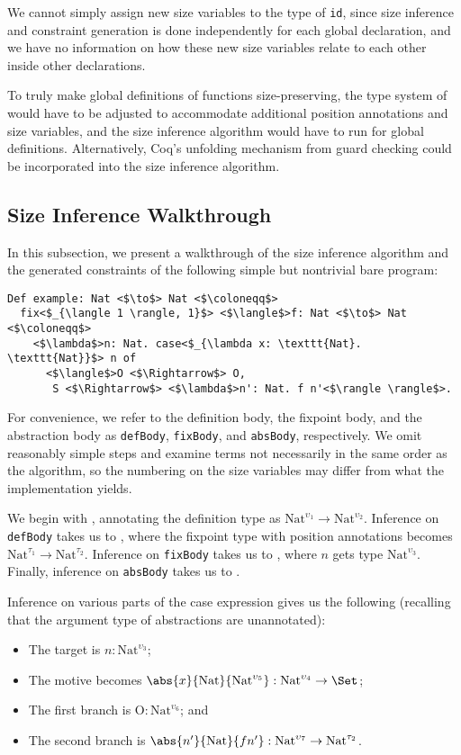 We cannot simply assign new size variables to the type of \texttt{id}, since size inference and constraint generation is done independently for each global declaration, and we have no information on how these new size variables relate to each other inside other declarations.

To truly make global definitions of functions size-preserving, the type system of \lang would have to be adjusted to accommodate additional position annotations and size variables, and the size inference algorithm would have to run \RecCheck for global definitions.
Alternatively, Coq's unfolding mechanism from guard checking could be incorporated into the size inference algorithm.

\subsection{Size Inference Walkthrough}
In this subsection, we present a walkthrough of the size inference algorithm and the generated constraints of the following simple but nontrivial bare \lang program:

\begin{verbatim}
Def example: Nat <$\to$> Nat <$\coloneqq$>
  fix<$_{\langle 1 \rangle, 1}$> <$\langle$>f: Nat <$\to$> Nat <$\coloneqq$>
    <$\lambda$>n: Nat. case<$_{\lambda x: \texttt{Nat}. \texttt{Nat}}$> n of
      <$\langle$>O <$\Rightarrow$> O,
       S <$\Rightarrow$> <$\lambda$>n': Nat. f n'<$\rangle \rangle$>.
\end{verbatim}

For convenience, we refer to the definition body, the fixpoint body, and the abstraction body as \texttt{defBody}, \texttt{fixBody}, and \texttt{absBody}, respectively.
We omit reasonably simple steps and examine terms not necessarily in the same order as the algorithm, so the numbering on the size variables may differ from what the implementation yields.

We begin with , annotating the definition type as $\text{Nat}^{\upsilon_1} \to \text{Nat}^{\upsilon_2}$.
Inference on \texttt{defBody} takes us to , where the fixpoint type with position annotations becomes $\text{Nat}^{\tau_1} \to \text{Nat}^{\tau_2}$.
Inference on \texttt{fixBody} takes us to , where $n$ gets type $\text{Nat}^{\upsilon_3}$.
Finally, inference on \texttt{absBody} takes us to .

Inference on various parts of the case expression gives us the following (recalling that the argument type of abstractions are unannotated):
\begin{itemize}
    \item The target is $n: \text{Nat}^{\upsilon_3}$;
    \item The motive becomes $\abs{x}{\text{Nat}}{\text{Nat}^{\upsilon_5}} : \text{Nat}^{\upsilon_4} \to \Set$;
    \item The first branch is $\text{O}: \text{Nat}^{\upsilon_6}$; and
    \item The second branch is $\abs{n'}{\text{Nat}}{f n'} : \text{Nat}^{\upsilon_7} \to \text{Nat}^{\tau_2}$.
\end{itemize}

